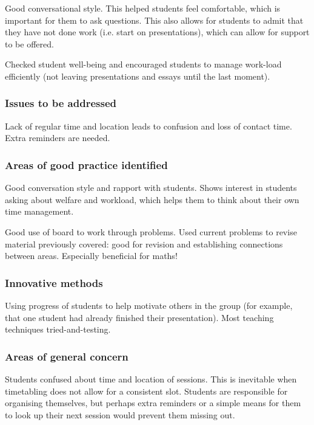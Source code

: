 Good conversational style. This helped students feel comfortable, which is important for them to ask questions. This also allows for students to admit that they have not done work (i.e. start on presentations), which can allow for support to be offered.

Checked student well-being and encouraged students to manage work-load efficiently (not leaving presentations and essays until the last moment).

\subsubsection{Issues to be addressed}

Lack of regular time and location leads to confusion and loss of contact time. Extra reminders are needed.

\subsubsection{Areas of good practice identified}

Good conversation style and rapport with students. Shows interest in students asking about welfare and workload, which helps them to think about their own time management.

Good use of board to work through problems. Used current problems to revise material previously covered: good for revision and establishing connections between areas. Especially beneficial for maths!

\subsubsection{Innovative methods}\label{sec:other-tutorial-innovative}

Using progress of students to help motivate others in the group (for example, that one student had already finished their presentation). Most teaching techniques tried-and-testing.

\subsubsection{Areas of general concern}\label{sec:other-tutorial-concern}

Students confused about time and location of sessions. This is inevitable when timetabling does not allow for a consistent slot. Students are responsible for organising themselves, but perhaps extra reminders or a simple means for them to look up their next session would prevent them missing out.

